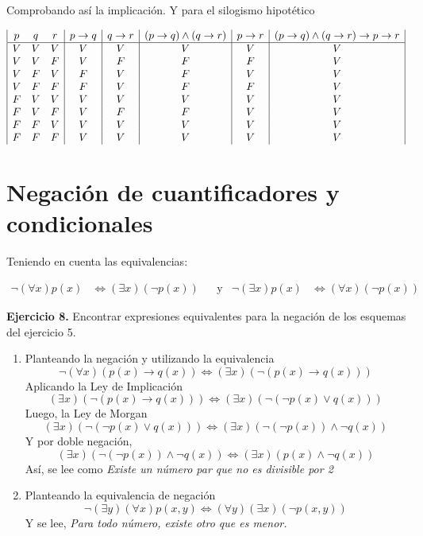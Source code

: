 Comprobando as\'i la implicaci\'on. Y para el silogismo hipot\'etico

\begin{displaymath}
	\hspace*{-0cm}
	\begin{array}{|c c c|c|c|c|c|c|}
		p & q & r & p \rightarrow q & q \rightarrow r & (p \rightarrow q) \wedge (q \rightarrow r) & p \rightarrow r & (p \rightarrow q) \wedge (q \rightarrow r) \rightarrow p \rightarrow r\\
		\hline 
		V & V & V & V & V & V & V & V\\
		V & V & F & V & F & F & F & V\\
		V & F & V & F & V & F & V & V\\
		V & F & F & F & V & F & F & V\\
		F & V & V & V & V & V & V & V\\
		F & V & F & V & F & F & V & V\\
		F & F & V & V & V & V & V & V\\
		F & F & F & V & V & V & V & V\\
	\end{array}
\end{displaymath}

\section{Negaci\'on de cuantificadores y condicionales}

Teniendo en cuenta las equivalencias:

\begin{align}
	\neg (\forall x)p(x) &\Leftrightarrow (\exists x)(\neg p(x)) & &\text{y} & \neg(\exists x)p(x) &\Leftrightarrow (\forall x)(\neg p(x))
\end{align}

\textbf{Ejercicio 8.} Encontrar expresiones equivalentes para la negación de los esquemas del ejercicio 5.

\begin{enumerate}
	\item Planteando la negaci\'on y utilizando la equivalencia
	\begin{equation*}
		\neg(\forall x)(p(x) \rightarrow q(x)) \Leftrightarrow (\exists x)(\neg(p(x) \rightarrow q(x)))
	\end{equation*}
	Aplicando la Ley de Implicaci\'on $$(\exists x)(\neg(p(x) \rightarrow q(x))) \Leftrightarrow (\exists x)(\neg(\neg p(x) \vee q(x)))$$ 
	Luego, la Ley de Morgan $$(\exists x)(\neg(\neg p(x) \vee q(x))) \Leftrightarrow (\exists x)(\neg (\neg p(x)) \wedge \neg q(x))$$ 
	Y por doble negaci\'on, $$(\exists x)(\neg (\neg p(x)) \wedge \neg q(x)) \Leftrightarrow (\exists x)(p(x) \wedge \neg q(x))$$ 
	As\'i, se lee como \textit{Existe un n\'umero par que no es divisible por 2}
	
	\item Planteando la equivalencia de negaci\'on $$\neg (\exists y)(\forall x)p(x,y) \Leftrightarrow (\forall y)(\exists x)(\neg p(x,y))$$ Y se lee, \textit{Para todo n\'umero, existe otro que es menor.}
\end{enumerate}